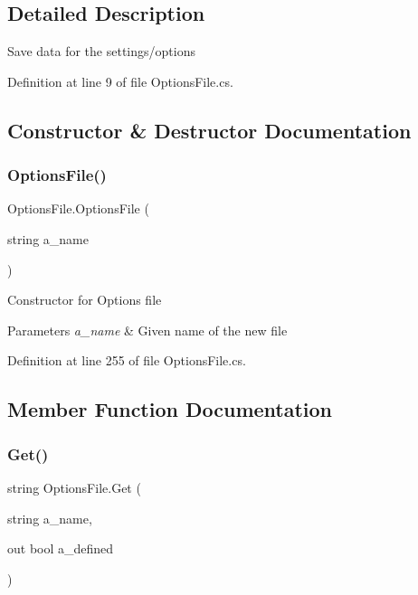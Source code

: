 \subsection{Detailed Description}
Save data for the settings/options ~\newline




Definition at line 9 of file Options\+File.\+cs.



\subsection{Constructor \& Destructor Documentation}
\mbox{\label{class_options_file_a2491b9fc88bdd86d876bdd7797fbed72}} 
\subsubsection{\texorpdfstring{Options\+File()}{OptionsFile()}}
{\footnotesize\ttfamily Options\+File.\+Options\+File (\begin{DoxyParamCaption}\item[{string}]{a\+\_\+name }\end{DoxyParamCaption})}



Constructor for Options file 


\begin{DoxyParams}{Parameters}
{\em a\+\_\+name} & Given name of the new file\\
\hline
\end{DoxyParams}


Definition at line 255 of file Options\+File.\+cs.



\subsection{Member Function Documentation}
\mbox{\label{class_options_file_a13132f95a77c7e853049e4a171070c98}} 
\subsubsection{\texorpdfstring{Get()}{Get()}}
{\footnotesize\ttfamily string Options\+File.\+Get (\begin{DoxyParamCaption}\item[{string}]{a\+\_\+name,  }\item[{out bool}]{a\+\_\+defined }\end{DoxyParamCaption})}



